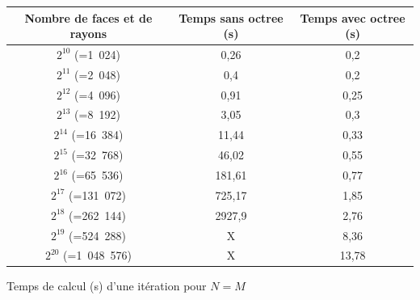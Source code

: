 \begin{tableth}
	\begin{tabular}{| c | c | c |}
		\hline
		Nombre de faces et de rayons & Temps \textbf{sans} \gls{octree} (s) & Temps \textbf{avec} \gls{octree} (s)\\
		  \hline
		  \hline
		   $2^{10}$ (=1~024) & 0,26 &	0,2 \\
		   \hline
		$2^{11}$ (=2~048)  & 0,4	& 0,2 \\
		   \hline
		$2^{12}$ (=4~096) & 0,91	& 0,25\\
		   \hline
		$2^{13}$ (=8~192) & 3,05 &	0,3\\
		   \hline
		$2^{14}$ (=16~384) & 11,44	&0,33\\
		   \hline
		$2^{15}$ (=32~768) & 46,02	&0,55 \\
		     \hline
		    $2^{16}$ (=65~536) & 181,61	& 0,77\\
		   \hline
		$2^{17}$ (=131~072) & 725,17	& 1,85\\
		\hline
		$2^{18}$ (=262~144) & 2927,9 & 2,76 \\
		\hline
		$2^{19}$ (=524~288) & X & 8,36 \\
		\hline
		$2^{20}$ (=1~048~576) & X & 13,78 \\
		\hline
	 \end{tabular}
	\caption{Temps de calcul (s) d'une itération pour $N = M$}
	\label{tabComplexite}
\end{tableth}


\clearpage

